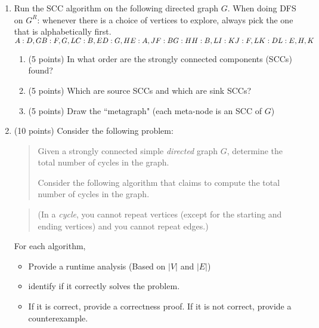 \documentclass[10pt,letterpaper,unboxed,cm]{article}
\begin{document}
\begin{enumerate}

\item Run the SCC algorithm on the following directed graph $G$. When doing DFS on $G^R$: whenever there is a choice of vertices to explore, always pick the one that is alphabetically first.\\
{\scriptsize$
A:  D,G\\
B:  F,G,L\\
C:  B,E\\
D:  G,H\\
E:  A,J\\
F:  B\\
G:  H\\
H:  B,L\\
I:  K\\
J:  F,L\\
K:  D\\
L:  E,H,K$}
\begin{enumerate}
\item (5 points)
In what order are the strongly connected components (SCCs) found?

\item (5 points)
Which are source SCCs and which are sink SCCs?

\item (5 points)
Draw the ``metagraph" (each meta-node is an SCC of $G$)
\end{enumerate}





\item (10 points)
Consider the following problem:

\begin{quote}
Given a strongly connected simple \emph{directed} graph $G$, determine the total number of cycles in the graph.

Consider the following algorithm that claims to compute the total number of cycles in the graph.
\end{quote}

\begin{quote}
(In a \emph{cycle}, you cannot repeat vertices (except for the starting and ending vertices) and you cannot repeat edges.)
\end{quote}

For each algorithm, 
\begin{itemize}
\item
Provide a runtime analysis (Based on $|V|$ and $|E|$)
\item
identify if it correctly solves the problem.
\item
If it is correct, provide a correctness proof. If it is not correct, provide a counterexample.
\end{itemize}



\end{enumerate}
\end{document}
